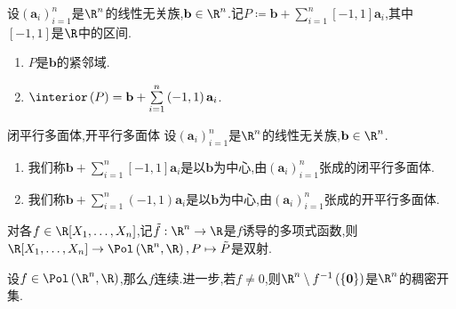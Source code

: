 \begin{proposition}{}{}
	设$\left(\mathbf{a}_{i}\right)_{i=1}^{n}$是$\R^{n}$的线性无关族,$\mathbf{b}\in\R^{n}$.记$P\coloneq\mathbf{b}+\sum\limits_{i=1}^{n}\left[-1,1\right]\mathbf{a}_{i}$,其中$\left[-1,1\right]$是$\R$中的区间.
	\begin{enumerate}
		\item $P$是$\mathbf{b}$的紧邻域.
		\item $\interior\left(P\right)=\mathbf{b}+\sum\limits_{i=1}^{n}\left(-1,1\right)\mathbf{a}_{i}$.
	\end{enumerate}
\end{proposition}

\begin{definition}{闭平行多面体,开平行多面体}{}
	设$\left(\mathbf{a}_{i}\right)_{i=1}^{n}$是$\R^{n}$的线性无关族,$\mathbf{b}\in\R^{n}$.
	\begin{enumerate}
		\item 我们称$\mathbf{b}+\sum\limits_{i=1}^{n}\left[-1,1\right]\mathbf{a}_{i}$是以$\mathbf{b}$为中心,由$\left(\mathbf{a}_{i}\right)_{i=1}^{n}$张成的闭平行多面体.
		\item 我们称$\mathbf{b}+\sum\limits_{i=1}^{n}\left(-1,1\right)\mathbf{a}_{i}$是以$\mathbf{b}$为中心,由$\left(\mathbf{a}_{i}\right)_{i=1}^{n}$张成的开平行多面体.
	\end{enumerate}
\end{definition}

\begin{proposition}{}{}
	对各$f\in\R[X_{1},\ldots,X_{n}]$,记$\tilde{f}:\R^{n}\to\R$是$f$诱导的多项式函数,则$\R[X_{1},\ldots,X_{n}]\to\Pol\left(\R^{n},\R\right),P\mapsto\tilde{P}$是双射.
\end{proposition}

\begin{proposition}{}{}
	设$f\in\Pol\left(\R^{n},\R\right)$,那么$f$连续.进一步,若$f\neq 0$,则$\R^{n}\setminus f^{-1}\left(\left\{\mathbf{0}\right\}\right)$是$\R^{n}$的稠密开集.
\end{proposition}















